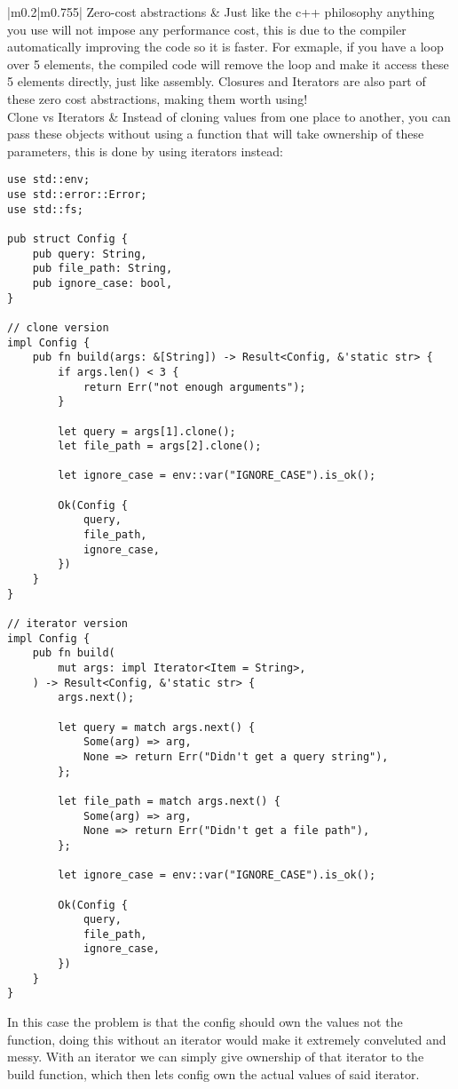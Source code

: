 \documentclass[main.tex,fontsize=8pt,paper=a4,paper=portrait,DIV=calc,]{scrartcl}
\begin{document}
\begin{table}[ht!]
\begin{tabular}{|m{0.2\linewidth}|m{0.755\linewidth}|}
\hline
Zero-cost abstractions & 
Just like the c++ philosophy anything you use will not impose any performance cost, this is due to the compiler automatically improving the code so it is faster.\newline
For exmaple, if you have a loop over 5 elements, the compiled code will remove the loop and make it access these 5 elements directly, just like assembly.\newline
\textcolor{OliveGreen}{Closures and Iterators are also part of these zero cost abstractions, making them worth using!}\\
\hline
Clone vs Iterators & 
Instead of cloning values from one place to another, you can pass these objects without using a function that will take ownership of these parameters, this is done by using iterators instead: \newline
\begin{lstlisting}
use std::env;
use std::error::Error;
use std::fs;

pub struct Config {
    pub query: String,
    pub file_path: String,
    pub ignore_case: bool,
}

// clone version
impl Config {
    pub fn build(args: &[String]) -> Result<Config, &'static str> {
        if args.len() < 3 {
            return Err("not enough arguments");
        }

        let query = args[1].clone();
        let file_path = args[2].clone();

        let ignore_case = env::var("IGNORE_CASE").is_ok();

        Ok(Config {
            query,
            file_path,
            ignore_case,
        })
    }
}

// iterator version
impl Config {
    pub fn build(
        mut args: impl Iterator<Item = String>,
    ) -> Result<Config, &'static str> {
        args.next();

        let query = match args.next() {
            Some(arg) => arg,
            None => return Err("Didn't get a query string"),
        };

        let file_path = match args.next() {
            Some(arg) => arg,
            None => return Err("Didn't get a file path"),
        };

        let ignore_case = env::var("IGNORE_CASE").is_ok();

        Ok(Config {
            query,
            file_path,
            ignore_case,
        })
    }
}
\end{lstlisting} 
In this case the problem is that the config should own the values not the function, doing this without an iterator would make it extremely conveluted and messy. With an iterator we can simply give ownership of that iterator to the build function, which then lets config own the actual values of said iterator.\\
\hline
\end{tabular}
\end{table}
\end{document}
